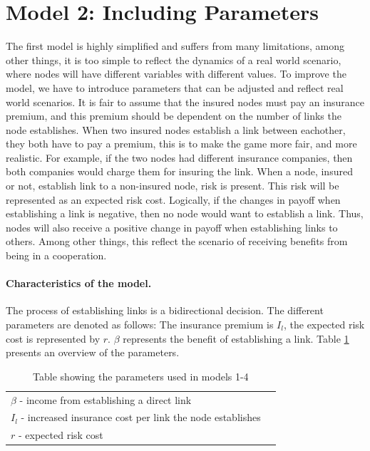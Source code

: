\section{Model 2: Including Parameters}
The first model is highly simplified and suffers from many limitations, among other  things, it is too simple to reflect the dynamics of a real world scenario, where nodes will have different variables with different values. To improve the model, we have to introduce parameters that can be adjusted and reflect real world scenarios.
It is fair to assume that the insured nodes must pay an insurance premium, and this premium should be dependent on the number of links the node establishes. When two insured nodes establish a link between eachother, they both have to pay a premium, this is to make the game more fair, and more realistic. For example, if the two nodes had different insurance companies, then both companies would charge them for insuring the link.
When a node, insured or not, establish link to a non-insured node, risk is present. This risk will be represented as an expected risk cost. Logically, if the changes in payoff when establishing a link is negative, then no node would want to establish a link. Thus, nodes will also receive a positive change in payoff when establishing links to others. Among other things, this reflect the scenario of receiving benefits from being in a cooperation. 

\paragraph{Characteristics of the model.}

The process of establishing links is a bidirectional decision. 
 The different parameters are denoted as follows: The insurance premium is $I_{l}$, the expected risk cost is represented by $r$. $\beta$ represents the benefit of establishing a link.  
Table \ref{tbl:simplegamepara} presents an overview of the parameters. 
\begin{table}[h]
\centering
\begin{tabular}{lc}
 \hline
  $\beta$ - income from establishing a direct link \\
  $I_{l}$ - increased insurance cost per link the node establishes\\
  $r$ - expected risk cost\\
  \hline
\end{tabular}
\caption{\label{tbl:simplegamepara} Table showing the parameters used in models 1-4}
\end{table}
